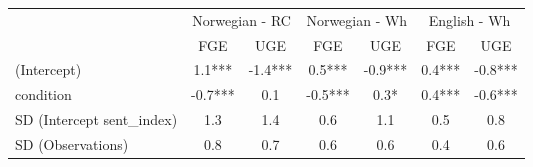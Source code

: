 \begin{longtable}{lcccccc}
\toprule
 & \multicolumn{2}{c}{Norwegian - RC} & \multicolumn{2}{c}{Norwegian - Wh} & \multicolumn{2}{c}{English - Wh} \\ 
\cmidrule(lr){2-3} \cmidrule(lr){4-5} \cmidrule(lr){6-7}
  & FGE & UGE & FGE & UGE & FGE & UGE \\ 
\midrule\addlinespace[2.5pt]
(Intercept) & 1.1*** & -1.4*** & 0.5*** & -0.9*** & 0.4*** & -0.8*** \\ 
condition & -0.7*** & 0.1 & -0.5*** & 0.3* & 0.4*** & -0.6*** \\ 
SD (Intercept sent\_index) & 1.3 & 1.4 & 0.6 & 1.1 & 0.5 & 0.8 \\ 
SD (Observations) & 0.8 & 0.7 & 0.6 & 0.6 & 0.4 & 0.6 \\ 
\bottomrule
\end{longtable}

